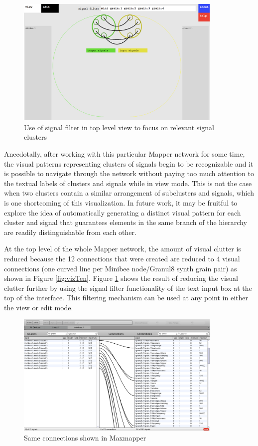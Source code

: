 \begin{figure}[hp]
\centering
\includegraphics[width=0.88\textwidth]{vizmapperEleven.png}
\caption{Use of signal filter in top level view to focus on relevant signal clusters}
\label{fig:vizEleven}
\end{figure}

Anecdotally, after working with this particular Mapper network for some time, the visual patterns representing clusters of signals begin to be recognizable and it is possible to navigate through the network without paying too much attention to the textual labels of clusters and signals while in view mode. This is not the case when two clusters contain a similar arrangement of subclusters and signals, which is one shortcoming of this visualization. In future work, it may be fruitful to explore the idea of automatically generating a distinct visual pattern for each cluster and signal that guarantees elements in the same branch of the hierarchy are readily distinguishable from each other.

At the top level of the whole Mapper network, the amount of visual clutter is reduced because the 12 connections that were created are reduced to 4 visual connections (one curved line per Minibee node/Granul8 synth grain pair) as shown in Figure \ref{fig:vizTen}. Figure \ref{fig:vizEleven} shows the result of reducing the visual clutter further by using the signal filter functionality of the text input box at the top of the interface. This filtering mechanism can be used at any point in either the view or edit mode.

\begin{figure}[hp]
\centering
\includegraphics[width=0.88\textwidth]{maxmapperSecond.png}
\caption{Same connections shown in Maxmapper}
\label{fig:maxTwo}
\end{figure}

